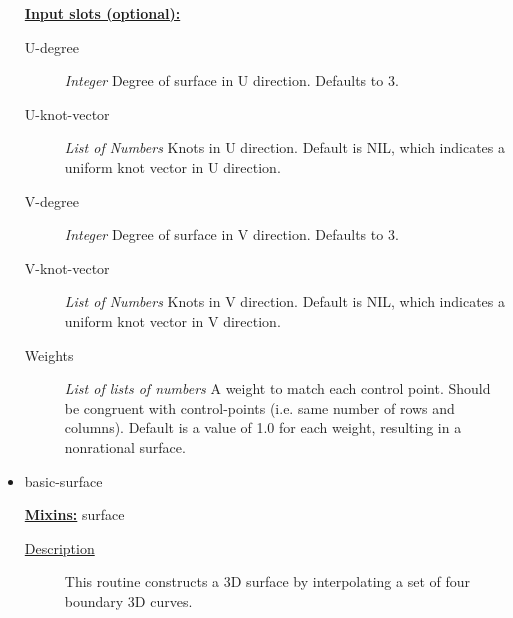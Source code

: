 \documentclass [11pt]{book}
\begin{document}
\begin{itemize}
\textbf{
\underline{Input slots (optional):}}

\begin{description}

\item [U-degree]
\emph{Integer} Degree of surface in U direction. Defaults to 3.


\item [U-knot-vector]
\emph{List of Numbers} Knots in U direction. Default is NIL, which indicates a uniform knot vector in U direction.


\item [V-degree]
\emph{Integer} Degree of surface in V direction. Defaults to 3.


\item [V-knot-vector]
\emph{List of Numbers} Knots in V direction. Default is NIL, which indicates a uniform knot vector in V direction.


\item [Weights]
\emph{List of lists of numbers} A weight to match each control point. Should be congruent with control-points
(i.e. same number of rows and columns). Default is a value of 1.0 for each weight, resulting in a nonrational surface.


\end{description}







\item {}basic-surface


\textbf{
\underline{Mixins:}} surface





\begin{description}

\item [
\underline{Description}]


This routine constructs a 3D surface by interpolating
   a set of four boundary 3D curves.



\end{description}




\begin{figure}
\begin{lrbox}{\boxedverb}
\begin{minipage}{\linewidth}
{\small

}
\end{minipage}
\end{lrbox}
\end{figure}
\end{itemize}
\end{document}
